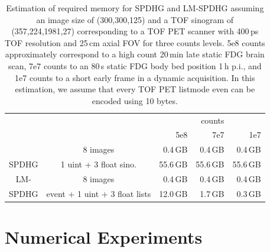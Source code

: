 \begin{table}
\begin{center}
\footnotesize
\begin{tabular}{ c c r r r}
         &                       &            & counts      & \\ 
         &                       & 5e8        & 7e7         & 1e7 \\ \hline
         & 8 images              &   0.4\,GB  &   0.4\,GB   &   0.4\,GB \\
SPDHG    & 1 uint + 3 float sino.&  55.6\,GB  &  55.6\,GB   &  55.6\,GB \\ \hline
LM-      & 8 images              &   0.4\,GB  &   0.4\,GB   &   0.4\,GB \\
SPDHG    & event + 1 uint + 3 float lists &  12.0\,GB  &   1.7\,GB   &   0.3\,GB
\end{tabular}
\end{center}
\caption{Estimation of required memory for SPDHG and LM-SPDHG assuming an image size of (300,300,125)
         and a TOF sinogram of (357,224,1981,27) corresponding to a TOF PET scanner with 400\,ps TOF
         resolution and 25\,cm axial FOV for three counts levels. 
         5e8 counts approximately correspond to a high count 20\,min late static FDG brain scan, 
         7e7 counts to an 80\,s static FDG body bed position 1\,h p.i., 
         and 1e7 counts to a short early frame in a dynamic acquisition.
         In this estimation, we assume that every TOF PET listmode even can be encoded using 10 bytes.}
\label{tab:mem}
\end{table}


\section{Numerical Experiments}

